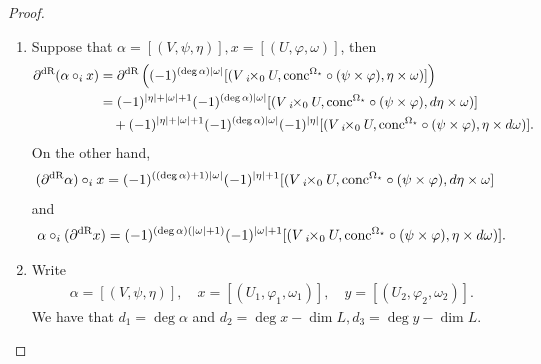 \documentclass[10pt]{amsart}
\numberwithin{equation}{section}
\theoremstyle{plain}
\theoremstyle{definition}
\theoremstyle{remark}
\numberwithin{equation}{section}
\newcommand{\dR}{\textup{dR}}
\newcommand{\fiberprod}[2]{\,_{#1}\!\!\times_{#2} }
\newcommand{\concOmega}{\textup{conc}^{\Omega_\star}}
\begin{document}
{\begin{proof}
	\begin{enumerate}
		\item Suppose that $\alpha=[(V,\psi, \eta)], x= [(U,\varphi,\omega)]$, then
		\begin{align*}
			\partial^\dR(\alpha\circ_i x)&= \partial ^\dR\left((-1)^{(\deg \alpha) |\omega|} [(V\fiberprod{i}{0} U, \concOmega\circ (\psi \times \varphi), \eta\times \omega)]\right)\\
			&= (-1)^{|\eta|+|\omega|+1}(-1)^{(\deg\alpha ) |\omega|}[(V\fiberprod{i}{0} U ,\concOmega\circ(\psi \times \varphi), d\eta\times \omega)]\\
			&\quad + (-1)^{|\eta|+|\omega|+1}(-1)^{(\deg\alpha)|\omega|}(-1)^{|\eta|}[(V\fiberprod{i}{0} U,\concOmega\circ(\psi\times \varphi) , \eta\times d\omega)].
		\end{align*}
		On the other hand,
		\begin{align*}
			(\partial^\dR \alpha)\circ_i x &= (-1)^{((\deg \alpha) +1)|\omega|}(-1)^{|\eta|+1}[ (V\fiberprod{i}{0} U, \concOmega\circ (\psi\times \varphi), d\eta \times \omega ]
		\end{align*}
		and 
		\begin{align*}
			\alpha\circ_i (\partial^\dR x)= (-1)^{(\deg \alpha)(|\omega|+1)}(-1)^{|\omega|+1}[ ( V\fiberprod{i}{0} U, \concOmega\circ(\psi \times \varphi), \eta \times d\omega)].
		\end{align*}
		\item Write 
		\begin{align*}
			\alpha =[(V,\psi,\eta)], \quad x=[(U_1,\varphi_1,\omega_1)], \quad y =[(U_2,\varphi_2,\omega_2)].
		\end{align*}
		We have that $d_1=\deg \alpha$ and $d_2=\deg x - \dim L, d_3=\deg y - \dim L$.
		

\end{enumerate}
\end{proof}}
\end{document}
